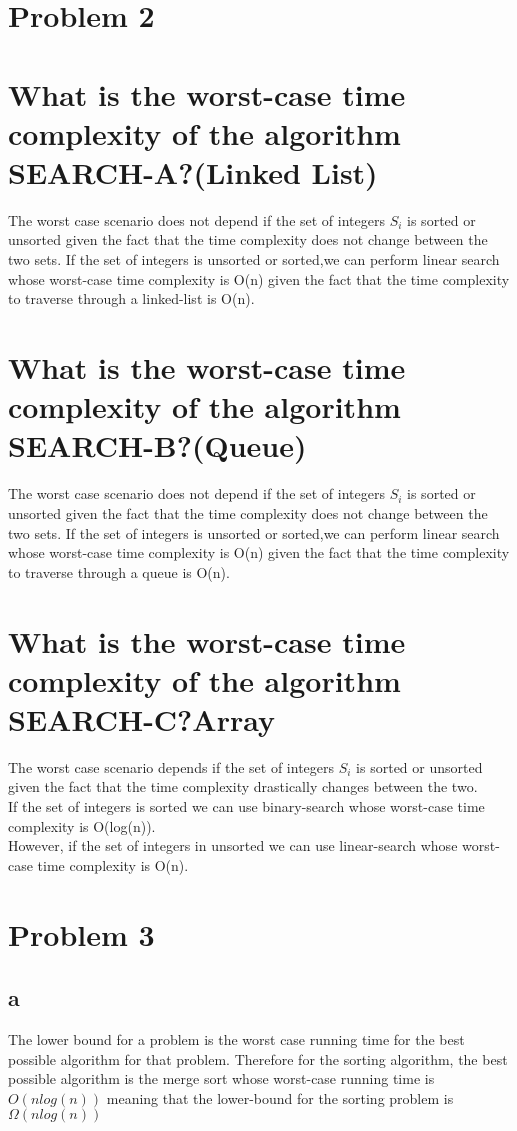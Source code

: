 \documentclass[11pt]{article}
\begin{document}
	\section*{Problem 2}
		\section*{What is the worst-case time complexity of the algorithm SEARCH-A?(Linked List)}
			The worst case scenario does not depend if the set of integers $S_i$ is sorted or unsorted given the fact that the time complexity does not change between the two sets. If the set of integers is unsorted or sorted,we can perform linear search whose worst-case time complexity is O(n) given the fact that the time complexity to traverse through a linked-list is O(n).\\
		\section*{What is the worst-case time complexity of the algorithm SEARCH-B?(Queue)}
			The worst case scenario does not depend if the set of integers $S_i$ is sorted or unsorted given the fact that the time complexity does not change between the two sets. If the set of integers is unsorted or sorted,we can perform linear search whose worst-case time complexity is O(n) given the fact that the time complexity to traverse through a queue is O(n).\\
		\section*{What is the worst-case time complexity of the algorithm SEARCH-C?Array}
			The worst case scenario depends if the set of integers $S_i$ is sorted or unsorted given the fact that the time complexity drastically changes between the two.\\
			If the set of integers is sorted we can use binary-search whose worst-case time complexity is O(log(n)).\\
			However, if the set of integers in unsorted we can use linear-search whose worst-case time complexity is O(n).\\
	\section*{Problem 3}
		\subsection*{a}
			The lower bound for a problem is the worst case running time for the best possible algorithm  for that problem. Therefore for the sorting algorithm, the best possible algorithm is the merge sort whose worst-case running time is $O(nlog(n))$ meaning that the lower-bound for the sorting problem is $\Omega(nlog(n))$
\end{document}
